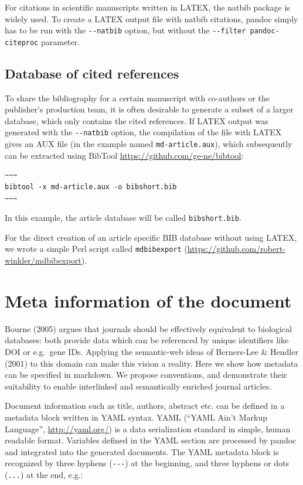 \documentclass[10pt,fleqn]{wlpeerj}
\begin{document}
For citations in scientific manuscripts written in LATEX, the natbib
package is widely used. To create a LATEX output file with natbib
citations, pandoc simply has to be run with the \texttt{-\/-natbib}
option, but without the \texttt{-\/-filter\ pandoc-citeproc} parameter.

\subsection{Database of cited
references}\label{database-of-cited-references}

To share the bibliography for a certain manuscript with co-authors or
the publisher's production team, it is often desirable to generate a
subset of a larger database, which only contains the cited references.
If LATEX output was generated with the \texttt{-\/-natbib} option, the
compilation of the file with LATEX gives an AUX file (in the example
named \texttt{md-article.aux}), which subsequently can be extracted
using BibTool \url{https://github.com/ge-ne/bibtool}:

\begin{verbatim}
~~~
bibtool -x md-article.aux -o bibshort.bib
~~~
\end{verbatim}

In this example, the article database will be called
\texttt{bibshort.bib}.

For the direct creation of an article specific BIB database without
using LATEX, we wrote a simple Perl script called \texttt{mdbibexport}
(\url{https://github.com/robert-winkler/mdbibexport}).

\section{Meta information of the
document}\label{meta-information-of-the-document}

Bourne (2005) argues that journals should be effectively equivalent to
biological databases: both provide data which can be referenced by
unique identifiers like DOI or e.g.~gene IDs. Applying the semantic-web
ideas of Berners-Lee \& Hendler (2001) to this domain can make this
vision a reality. Here we show how metadata can be specified in
markdown. We propose conventions, and demonstrate their suitability to
enable interlinked and semantically enriched journal articles.

Document information such as title, authors, abstract etc. can be
defined in a metadata block written in YAML syntax. YAML (``YAML Ain't
Markup Language'', \url{http://yaml.org/}) is a data serialization
standard in simple, human readable format. Variables defined in the YAML
section are processed by pandoc and integrated into the generated
documents. The YAML metadata block is recognized by three hyphens
(\texttt{-\/-\/-}) at the beginning, and three hyphens or dots
(\texttt{...}) at the end, e.g.:
\end{document}
